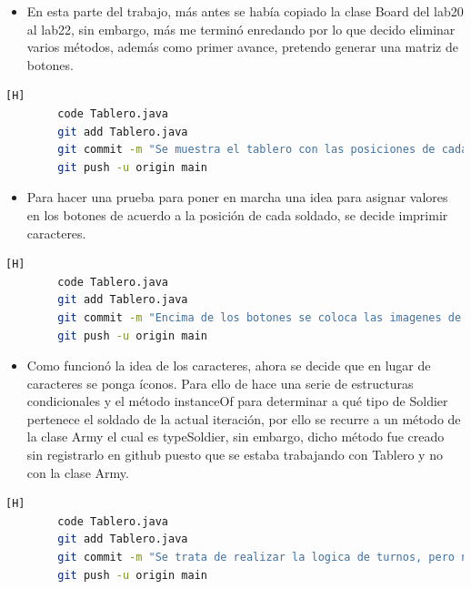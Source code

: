 \documentclass{article}
\begin{document}
	
	\begin{itemize}
	\item En esta parte del trabajo, más antes se había copiado la clase Board del lab20 al lab22, sin embargo, más me terminó enredando por lo que decido eliminar varios métodos, además como primer avance, pretendo generar una matriz de botones. 
	\end{itemize}
	
	\begin{lstlisting}[language=bash,caption={Commit: e9567435759726fa3977d549e7b5e96619c935ae }][H]
		code Tablero.java
		git add Tablero.java
		git commit -m "Se muestra el tablero con las posiciones de cada soldado que estan representados con caracteres"			
		git push -u origin main
	\end{lstlisting}
	
	
	\begin{itemize}
	\item Para hacer una prueba para poner en marcha una idea para asignar valores en los botones de acuerdo a la posición de cada soldado, se decide imprimir caracteres. 
	\end{itemize}
	
	
	
	\begin{lstlisting}[language=bash,caption={Commit: fde297f82a2db07850d0ebfb414669aee7afef58 }][H]
		code Tablero.java
		git add Tablero.java
		git commit -m "Encima de los botones se coloca las imagenes de los tipos de guerreos correspondiente"			
		git push -u origin main
	\end{lstlisting}
	
	
	\begin{itemize}
	\item Como funcionó la idea de los caracteres, ahora se decide que en lugar de caracteres se ponga íconos. Para ello de hace una serie de estructuras condicionales y el método instanceOf para determinar a qué tipo de Soldier pertenece el soldado de la actual iteración, por ello se recurre a un método de la clase Army el cual es typeSoldier, sin embargo, dicho método fue creado sin registrarlo en github puesto que se estaba trabajando con Tablero y no con la clase Army.
	\end{itemize}
	
	
	

	\begin{lstlisting}[language=bash,caption={Commit: 238928df88e329446fe7864bed270d1889ed721f }][H]
		code Tablero.java
		git add Tablero.java
		git commit -m "Se trata de realizar la logica de turnos, pero no dio resultados lo propuesto, se debe recurrrir a otro metodo"			
		git push -u origin main
	\end{lstlisting}
	
\end{document}
